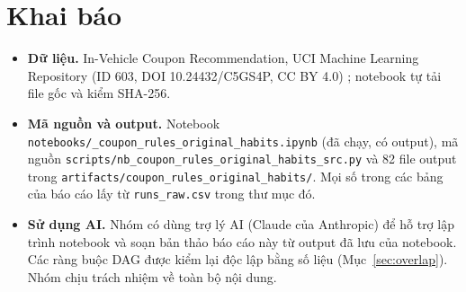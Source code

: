 \documentclass[pdflatex,sn-mathphys-num]{sn-jnl}%
\begin{document}
\backmatter

\section*{Khai báo}

\begin{itemize}
\item \textbf{Dữ liệu.} In-Vehicle Coupon Recommendation, UCI Machine Learning Repository (ID 603, DOI 10.24432/C5GS4P, CC BY 4.0) \cite{uci603}; notebook tự tải file gốc và kiểm SHA-256.
\item \textbf{Mã nguồn và output.} Notebook \texttt{notebooks/\_coupon\_rules\_\allowbreak original\_habits.ipynb} (đã chạy, có output), mã nguồn \texttt{scripts/\allowbreak nb\_coupon\_rules\_\allowbreak original\_habits\_src.py} và 82 file output trong \texttt{artifacts/\allowbreak coupon\_rules\_\allowbreak original\_habits/}. Mọi số trong các bảng của báo cáo lấy từ \texttt{runs\_raw.csv} trong thư mục đó.
\item \textbf{Sử dụng AI.} Nhóm có dùng trợ lý AI (Claude của Anthropic) để hỗ trợ lập trình notebook và soạn bản thảo báo cáo này từ output đã lưu của notebook. Các ràng buộc DAG được kiểm lại độc lập bằng số liệu (Mục~\ref{sec:overlap}). Nhóm chịu trách nhiệm về toàn bộ nội dung.
\end{itemize}


\end{document}
